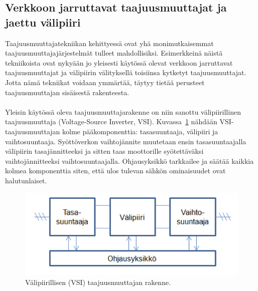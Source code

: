 \documentclass[finnish,12pt,a4paper,pdftex,elec,utf8]{aaltothesis}
\begin{document}






\subsection{Verkkoon jarruttavat taajuusmuuttajat ja jaettu välipiiri}
Taajuusmuuttajatekniikan kehittyessä ovat yhä monimutkaisemmat taajuusmuuttajajärjestelmät tulleet mahdollisiksi. Esimerkkeinä näistä tekniikoista ovat nykyään jo yleisesti käytössä olevat verkkoon jarruttavat taajuusmuuttajat ja välipiirin välityksellä toisiinsa kytketyt taajuusmuuttajat. Jotta nämä tekniikat voidaan ymmärtää, täytyy tietää perusteet taajuusmuuttajan sisäisestä rakenteesta.
\\\\
Yleisin käytössä oleva taajuusmuuttajarakenne on niin sanottu välipiirillinen taajuusmuuttaja (Voltage-Source Inverter, VSI). Kuvassa~\ref{fig:VSI} nähdään VSI-taajuusmuuttajan kolme pääkomponenttia: tasasuuntaaja, välipiiri ja vaihtosuuntaaja. Syöttöverkon vaihtojännite muutetaan ensin tasasuuntaajalla välipiirin tasajännitteeksi ja sitten taas moottorille syötettäväksi vaihtojännitteeksi vaihtosuuntaajalla. Ohjausyksikkö tarkkailee ja säätää kaikkia kolmea komponenttia siten, että ulos tulevan sähkön ominaisuudet ovat halutunlaiset. \cite{ABBtechnicalguide}

\begin{figure}[H]
	\begin{center}
	\includegraphics[scale=0.65]{VSI}
	\end{center}
	\caption{Välipiirillisen (VSI) taajuusmuuttajan rakenne.
		 \cite[s. 2]{VSI}}
	\label{fig:VSI}
\end{figure}
\end{document}
